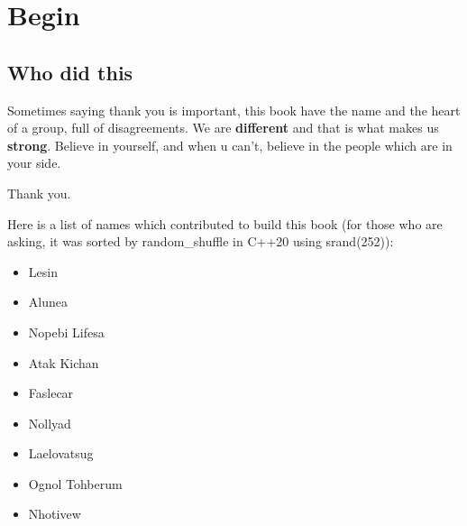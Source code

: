 \chapter{Begin}
    \section{Who did this}
    Sometimes saying thank you is important, this book have the name and the heart of a group, full of disagreements. We are \textbf{different} and that is what makes us \textbf{strong}. Believe in yourself, and when u can't, believe in the people which are in your side.

    Thank you.

    Here is a list of names which contributed to build this book (for those who are asking, it was sorted by random\_shuffle  in C++20 using srand(252)):
    \begin{itemize}
        \item Lesin
        \item Alunea
        \item Nopebi Lifesa
        \item Atak Kichan
        \item Faslecar
        \item Nollyad
        \item Laelovatsug
        \item Ognol Tohberum
        \item Nhotivew
    \end{itemize}
